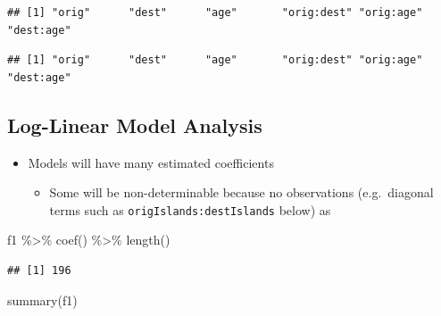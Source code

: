 \documentclass[
]{book}
\newenvironment{Shaded}{\begin{snugshade}}{\end{snugshade}}
\newcommand{\FunctionTok}[1]{\textcolor[rgb]{0.00,0.00,0.00}{#1}}
\newcommand{\NormalTok}[1]{#1}
\newcommand{\SpecialCharTok}[1]{\textcolor[rgb]{0.00,0.00,0.00}{#1}}
\newcommand{\StringTok}[1]{\textcolor[rgb]{0.31,0.60,0.02}{#1}}
\providecommand{\tightlist}{%
  \setlength{\itemsep}{0pt}\setlength{\parskip}{0pt}}
\begin{document}
\begin{verbatim}
## [1] "orig"      "dest"      "age"       "orig:dest" "orig:age"  "dest:age"
\end{verbatim}

\begin{Shaded}
\end{Shaded}

\begin{verbatim}
## [1] "orig"      "dest"      "age"       "orig:dest" "orig:age"  "dest:age"
\end{verbatim}

\hypertarget{log-linear-model-analysis-3}{%
\subsection{Log-Linear Model Analysis}\label{log-linear-model-analysis-3}}

\begin{itemize}
\tightlist
\item
  Models will have many estimated coefficients

  \begin{itemize}
  \tightlist
  \item
    Some will be non-determinable because no observations (e.g.~diagonal terms such as \texttt{origIslands:destIslands} below) as
  \end{itemize}
\end{itemize}

\begin{Shaded}
\begin{Highlighting}[]
\NormalTok{f1 }\SpecialCharTok{\%\textgreater{}\%} 
  \FunctionTok{coef}\NormalTok{() }\SpecialCharTok{\%\textgreater{}\%} 
  \FunctionTok{length}\NormalTok{()}
\end{Highlighting}
\end{Shaded}

\begin{verbatim}
## [1] 196
\end{verbatim}

\begin{Shaded}
\begin{Highlighting}[]
\FunctionTok{summary}\NormalTok{(f1)}
\end{Highlighting}
\end{Shaded}
\end{document}
